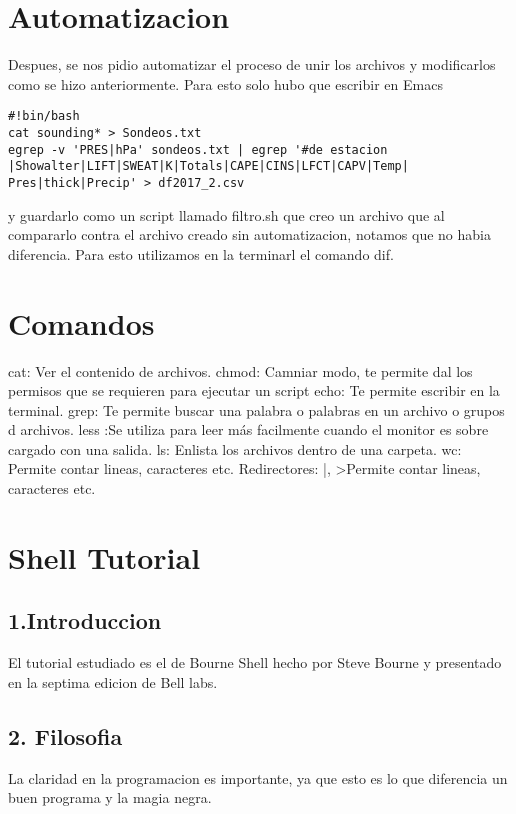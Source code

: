 \documentclass[a4paper]{article}
\begin{document}
\section{Automatizacion}
Despues, se nos pidio automatizar el proceso de unir los archivos y modificarlos como se hizo anteriormente. Para esto solo hubo que escribir en Emacs 
\begin{verbatim}
#!bin/bash
cat sounding* > Sondeos.txt
egrep -v 'PRES|hPa' sondeos.txt | egrep '#de estacion
|Showalter|LIFT|SWEAT|K|Totals|CAPE|CINS|LFCT|CAPV|Temp|
Pres|thick|Precip' > df2017_2.csv

\end{verbatim}

y guardarlo como un script llamado filtro.sh que creo un archivo que al compararlo contra el archivo creado sin automatizacion, notamos que no habia diferencia. Para esto utilizamos en la terminarl el comando dif. 

\section{Comandos}

    cat: Ver el contenido de archivos.
    chmod: Camniar modo, te permite dal los permisos que se requieren para ejecutar un script
    echo: Te permite escribir en la terminal.
    grep: Te permite buscar una palabra o palabras en un archivo o grupos d archivos.
    less :Se utiliza para leer más facilmente cuando el monitor es sobre cargado con una salida. 
    ls: Enlista los archivos dentro de una carpeta. 
    wc: Permite contar lineas, caracteres etc.
    Redirectores: |, >Permite contar lineas, caracteres etc.


\section{Shell Tutorial}

\subsection{1.Introduccion}

El tutorial estudiado es el de Bourne Shell hecho por Steve Bourne y presentado en la septima edicion de Bell labs.

\subsection{2. Filosofia}

La claridad en la programacion es importante, ya que esto es lo que diferencia un buen programa y la magia negra.
\end{document}
